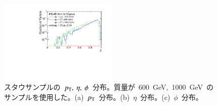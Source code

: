 \begin{figure}[H]
\begin{minipage}{0.49\hsize}
    \subcaption{}
    \end{minipage}\\
    \begin{minipage}{0.99\hsize}
    \centering   
    \includegraphics[width=0.5\textwidth,page=4]{img/plot/beta.pdf}
    \subcaption{}
    \end{minipage}
    \caption[スタウサンプルの~$p_{\rm{T}},~\eta,~\phi$~分布]{スタウサンプルの~$p_{\rm{T}},~\eta,~\phi$~分布。質量が~600~GeV,~1000~GeV~のサンプルを使用した。(a)~$p_{\rm{T}}$~分布。(b)~$\eta$~分布。(c)~$\phi$~分布。}\label{fig:staud1}
\end{figure}


